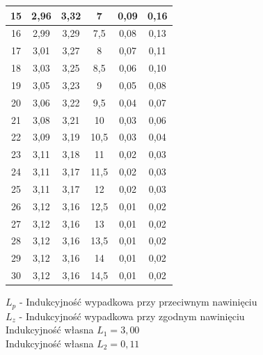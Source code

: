 \documentclass[a4paper,10pt,twoside]{article}
\begin{document}
\begin{table}[htb]
\begin{tabular}{|c|c|c|c|c|c|}
		15     & 2,96       & 3,32 & 7       & 0,09                          & 0,16                      \\ \hline
		16     & 2,99       & 3,29 & 7,5     & 0,08                          & 0,13                      \\ \hline
		17     & 3,01       & 3,27 & 8       & 0,07                          & 0,11                      \\ \hline
		18     & 3,03       & 3,25 & 8,5     & 0,06                          & 0,10                      \\ \hline
		19     & 3,05       & 3,23 & 9       & 0,05                          & 0,08                      \\ \hline
		20     & 3,06       & 3,22 & 9,5     & 0,04                          & 0,07                      \\ \hline
		21     & 3,08       & 3,21 & 10      & 0,03                          & 0,06                      \\ \hline
		22     & 3,09       & 3,19 & 10,5    & 0,03                          & 0,04                      \\ \hline
		23     & 3,11       & 3,18 & 11      & 0,02                          & 0,03                      \\ \hline
		24     & 3,11       & 3,17 & 11,5    & 0,02                          & 0,03                      \\ \hline
		25     & 3,11       & 3,17 & 12      & 0,02                          & 0,03                      \\ \hline
		26     & 3,12       & 3,16 & 12,5    & 0,01                          & 0,02                      \\ \hline
		27     & 3,12       & 3,16 & 13      & 0,01                          & 0,02                      \\ \hline
		28     & 3,12       & 3,16 & 13,5    & 0,01                          & 0,02                      \\ \hline
		29     & 3,12       & 3,16 & 14      & 0,01                          & 0,02                      \\ \hline
		30     & 3,12       & 3,16 & 14,5    & 0,01                          & 0,02                      \\ \hline
	\end{tabular}
\end{table}
\noindent
$L_p$ - Indukcyjność wypadkowa przy przeciwnym nawinięciu \\
$L_z$ - Indukcyjność wypadkowa przy zgodnym nawinięciu \\
Indukcyjność własna $L_1 = 3,00$\\
Indukcyjność własna $L_2 = 0,11$
\end{document}
